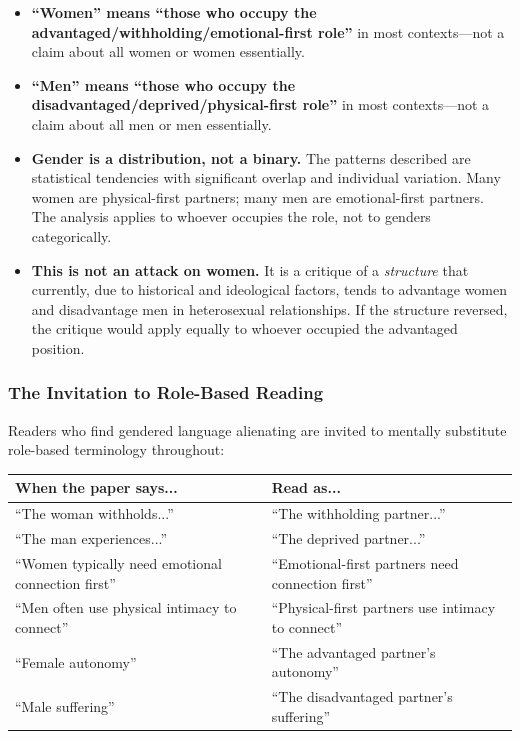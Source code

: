 \documentclass[12pt, letterpaper]{article}
\begin{document}
\begin{itemize}
    \item \textbf{``Women'' means ``those who occupy the advantaged/withholding/emotional-first role''} in most contexts---not a claim about all women or women essentially.
    
    \item \textbf{``Men'' means ``those who occupy the disadvantaged/deprived/physical-first role''} in most contexts---not a claim about all men or men essentially.
    
    \item \textbf{Gender is a distribution, not a binary.} The patterns described are statistical tendencies with significant overlap and individual variation. Many women are physical-first partners; many men are emotional-first partners. The analysis applies to whoever occupies the role, not to genders categorically.
    
    \item \textbf{This is not an attack on women.} It is a critique of a \textit{structure} that currently, due to historical and ideological factors, tends to advantage women and disadvantage men in heterosexual relationships. If the structure reversed, the critique would apply equally to whoever occupied the advantaged position.
\end{itemize}

\subsubsection{The Invitation to Role-Based Reading}

Readers who find gendered language alienating are invited to mentally substitute role-based terminology throughout:

\begin{center}
\begin{tabular}{|p{2.5in}|p{2.5in}|}
\hline
\textbf{When the paper says...} & \textbf{Read as...} \\
\hline
``The woman withholds...'' & ``The withholding partner...'' \\
\hline
``The man experiences...'' & ``The deprived partner...'' \\
\hline
``Women typically need emotional connection first'' & ``Emotional-first partners need connection first'' \\
\hline
``Men often use physical intimacy to connect'' & ``Physical-first partners use intimacy to connect'' \\
\hline
``Female autonomy'' & ``The advantaged partner's autonomy'' \\
\hline
``Male suffering'' & ``The disadvantaged partner's suffering'' \\
\hline
\end{tabular}
\end{center}
\end{document}
